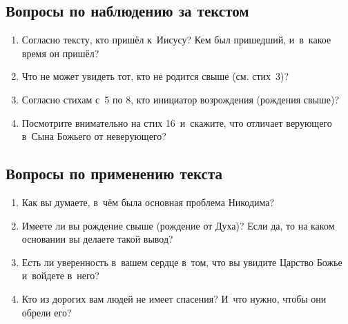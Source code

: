 \documentclass[a4paper,12pt]{article}
\begin{document}
\subsection*{Вопросы по наблюдению за текстом}
\begin{enumerate}
    \item Согласно тексту, кто пришёл к~Иисусу? Кем был пришедший, и~в~какое время он пришёл? 
    
    \myline
    
    \myline
    \item Что не может увидеть тот, кто не родится свыше (см. стих~3)? 
    
    \myline
    
    \myline
    \item Согласно стихам с~5 по 8, кто инициатор возрождения (рождения свыше)? 
    
    \myline
    
    \myline
    \item Посмотрите внимательно на стих 16~и~скажите, что отличает верующего в~Сына Божьего от неверующего?
    
    \myline
    
    \myline
\end{enumerate}

\subsection*{Вопросы по применению текста} 
\begin{enumerate}
    \item Как вы думаете, в~чём была основная проблема Никодима? 
    
    \myline
    
    \myline
    \item Имеете ли вы рождение свыше (рождение от Духа)? Если да, то на каком основании вы делаете такой вывод? 
    
    \myline
    
    \myline
    \item Есть ли уверенность в~вашем сердце в~том, что вы увидите Царство Божье и~войдете в~него? 
    
    \myline
    
    \myline
    \item Кто из дорогих вам людей не имеет спасения? И~что нужно, чтобы они обрели его?
    
    \myline
    
    \myline
\end{enumerate}
\end{document}
